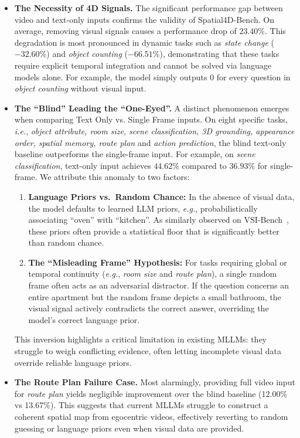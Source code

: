\documentclass{article}
\newcommand{\eg}{\textit{e.g.}}
\newcommand{\ie}{\emph{i.e.}}
\begin{document}
\begin{itemize}
    \item{
        \textbf{The Necessity of 4D Signals.}
        The significant performance gap between video and text-only inputs confirms the validity of Spatial4D-Bench.
        On average, removing visual signals causes a performance drop of $23.40\%$.
        This degradation is most pronounced in dynamic tasks such as \textit{state change} ($-32.60\%$) and \textit{object counting} ($-66.51\%$), demonstrating that these tasks require explicit temporal integration and cannot be solved via language models alone. For example, the model simply outputs $0$ for every question in \textit{object counting} without visual input.
    }
    \item{
        \textbf{The ``Blind'' Leading the ``One-Eyed''.}
        A distinct phenomenon emerges when comparing Text Only vs. Single Frame inputs.
        On eight specific tasks, \ie, \textit{object attribute, room size, scene classification, 3D grounding, appearance order, spatial memory, route plan} and \textit{action prediction}, the blind text-only baseline outperforms the single-frame input.
        For example, on \textit{scene classification}, text-only input achieves $44.62\%$ compared to $36.93\%$ for single-frame.
        We attribute this anomaly to two factors:
        \begin{enumerate}
            \item {\textbf{Language Priors vs.\ Random Chance:}
            In the absence of visual data, the model defaults to learned LLM priors, \eg, probabilistically associating ``oven'' with ``kitchen''.
            As similarly observed on VSI-Bench~\cite{Yang_2025_CVPR}, these priors often provide a statistical floor that is significantly better than random chance.}
            \item \textbf{The ``Misleading Frame'' Hypothesis:}
            For tasks requiring global or temporal continuity (\eg, \textit{room size} and \textit{route plan}), a single random frame often acts as an adversarial distractor.
            If the question concerns an entire apartment but the random frame depicts a small bathroom, the visual signal actively contradicts the correct answer, overriding the model's correct language prior.
        \end{enumerate}
        This inversion highlights a critical limitation in existing MLLMs: they struggle to weigh conflicting evidence, often letting incomplete visual data override reliable language priors.
    }
    \item{
        \textbf{The Route Plan Failure Case.}
        Most alarmingly, providing full video input for \textit{route plan} yields negligible improvement over the blind baseline (12.00\% vs 13.67\%).
        This suggests that current MLLMs struggle to construct a coherent spatial map from egocentric videos, effectively reverting to random guessing or language priors even when visual data are provided.
    }
\end{itemize}
\end{document}
